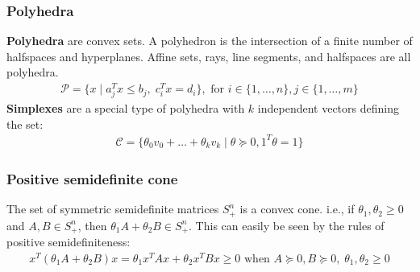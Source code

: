 \documentclass{article}
\begin{document}
\subsubsection{Polyhedra}
\textbf{Polyhedra} are convex sets. A polyhedron is the intersection of a finite number of halfspaces and hyperplanes. Affine sets, rays, line segments, and halfspaces are all polyhedra.
\begin{align*}
  \mathcal{P} = \{ x \mid a_j^Tx \leq b_j, \; c_i^Tx = d_i \}, \textrm{ for } i\in\{1, \dots, n\}, j\in\{1, \dots, m\}
\end{align*}
\textbf{Simplexes} are a special type of polyhedra with $k$ independent vectors defining the set:
\begin{align*}
  \mathcal{C} = \{\theta_0v_0 + \dots + \theta_kv_k \mid \theta \succeq0, 1^T\theta = 1\}
\end{align*}


\subsubsection{Positive semidefinite cone}
The set of symmetric semidefinite matrices $S^n_+$ is a convex cone. i.e., if $\theta_1, \theta_2 \geq 0$ and $A,B\in S^n_+$, then $\theta_1A + \theta_2B \in S^n_+$. This can easily be seen by the rules of positive semidefiniteness:
\begin{align*}
  x^T(\theta_1A + \theta_2B)x = \theta_1x^TAx + \theta_2x^TBx \geq 0 \textrm{ when } A \succeq 0, B \succeq 0, \; \theta_1,\theta_2 \geq 0
\end{align*}
\end{document}
